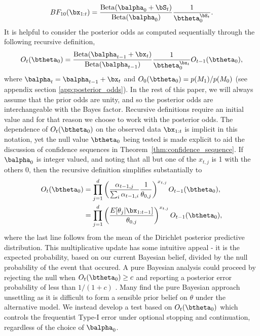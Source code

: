 \documentclass[11pt]{article}
\newcommand{\Beta}{\mathrm{Beta}}
\begin{document}
\begin{equation}
  \label{eq:simplified_bayes_factor}
 BF_{10}(\bx_{1:t}) = \frac{\Beta(\balpha_0 + \bS_t)}{\Beta(\balpha_0)}\frac{1}{\btheta_0^{\bS_t}}.
\end{equation}
It is helpful to consider the posterior odds as computed sequentially through the following recursive definition,
\begin{equation}
  \label{eq:update_rule}
  O_{t}(\btheta_0) = \frac{\Beta(\balpha_{t-1} + \bx_t)}{\Beta(\balpha_{t-1})}\frac{1}{\btheta_0^{\bx_t}} O_{t-1}(\btheta_0),
\end{equation}
where $\balpha_t = \balpha_{t-1}+\bx_t$ and $O_0(\btheta_0)=p(M_1)/p(M_0)$ (see appendix section \ref{app:posterior_odds}).
In the rest of this paper, we will always assume that the prior odds are unity, and so the posterior odds are interchangeable with the Bayes factor.
Recursive definitions require an initial value and for that reason we choose to work with the posterior odds.
The dependence of $O_t(\btheta_0)$ on the observed data $\bx_{1:t}$ is implicit in this notation, yet the null value $\btheta_0$ being tested is made explicit to aid the discussion of confidence sequences in Theorem~\ref{thm:confidence_sequence}.
If $\balpha_0$ is integer valued, and noting that all but one of the $x_{t,j}$ is 1 with the others 0, then the recursive definition simplifies substantially to
\begin{align}
  \label{eq:simplified_bayes_factor}
  O_{t}(\btheta_0) &= \prod_{j=1}^{d} \left(\frac{\alpha_{t-1,j}}{\sum_i \alpha_{t-1,i}} \frac{1}{\theta_{0,j}}\right)^{x_{t,j}} O_{t-1}(\btheta_0),\\
  &=\prod_{j=1}^{d}\left(\frac{E[\theta_j|\bx_{1:t-1}]}{\theta_{0,j}} \right)^{x_{t,j}} O_{t-1}(\btheta_0),
\end{align}
where the last line follows from the mean of the Dirichlet posterior predictive distribution.
This multiplicative update has some intuitive appeal - it is the expected probability, based on our current Bayesian belief, divided by the null probability of the event that occured.
A pure Bayesian analysis could proceed by rejecting the null when $O_t(\btheta_0) \geq c$ and reporting a posterior error probability of less than $1/(1+c)$ \citep[Chapter 5]{bernardo}.
Many find the pure Bayesian approach unsettling as it is difficult to form a sensible prior belief on $\theta$ under the alternative model.
We instead develop a test based on $O_t(\btheta_0)$ which controls the frequentist Type-I error under optional stopping and continuation, regardless of the choice of $\balpha_0$.
\end{document}

